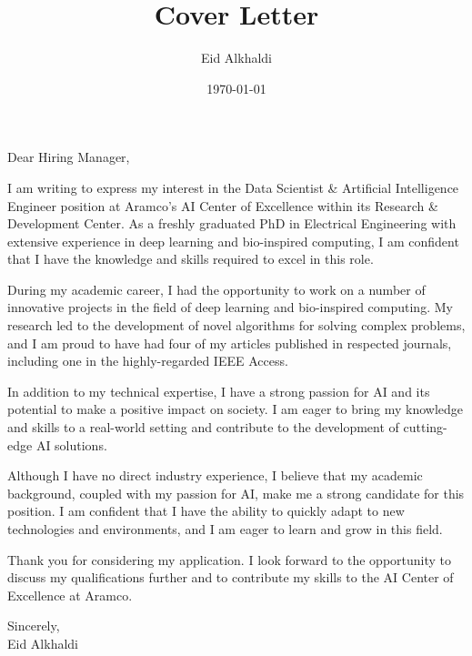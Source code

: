 \documentclass[11pt]{article}
\author{Eid Alkhaldi}
\date{\today}
\title{Cover Letter}
\begin{document}
\maketitle
\noindent
Dear Hiring Manager,

I am writing to express my interest in the Data Scientist \& Artificial Intelligence Engineer position at Aramco's AI Center of Excellence within its Research \& Development Center. As a freshly graduated PhD in Electrical Engineering with extensive experience in deep learning and bio-inspired computing, I am confident that I have the knowledge and skills required to excel in this role.

During my academic career, I had the opportunity to work on a number of innovative projects in the field of deep learning and bio-inspired computing. My research led to the development of novel algorithms for solving complex problems, and I am proud to have had four of my articles published in respected journals, including one in the highly-regarded IEEE Access.

In addition to my technical expertise, I have a strong passion for AI and its potential to make a positive impact on society. I am eager to bring my knowledge and skills to a real-world setting and contribute to the development of cutting-edge AI solutions.

Although I have no direct industry experience, I believe that my academic background, coupled with my passion for AI, make me a strong candidate for this position. I am confident that I have the ability to quickly adapt to new technologies and environments, and I am eager to learn and grow in this field.

Thank you for considering my application. I look forward to the opportunity to discuss my qualifications further and to contribute my skills to the AI Center of Excellence at Aramco.


\noindent
Sincerely,\\
Eid Alkhaldi
\end{document}
